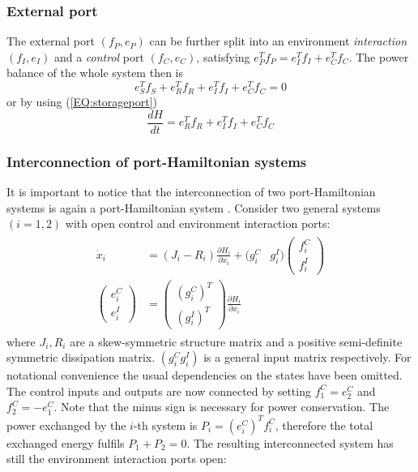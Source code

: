 \documentclass[a4paper,twoside, openright,12pt]{report}
\begin{document}
\subsubsection{External port}
The external port $(f_P,e_P)$ can be further split into an environment \emph{interaction} $(f_I,e_I)$ and a \emph{control} port $(f_C,e_C)$, satisfying $e_P^Tf_P = e_I^Tf_I + e_C^Tf_C$.
The power balance of the whole system then is
\begin{equation}
	e_S^Tf_S + e_R^T f_R +e_I^Tf_I + e_C^T f_C = 0
\end{equation} 
or by using (\ref{EQ:storageport})
\begin{equation}\label{EQ:energybalance}
	\frac{dH}{dt} = e_R^T f_R +e_I^Tf_I + e_C^T f_C 
\end{equation}

\subsubsection{Interconnection of port-Hamiltonian systems}
It is important to notice that the interconnection of two port-Hamiltonian systems is again a port-Hamiltonian system \cite{Schaft_14}. Consider two general systems $(i=1,2)$ with open control and environment interaction ports:
\begin{eqnarray}
\begin{aligned}
	\dot{x}_i &= (J_i - R_i)\frac{\partial H_i}{\partial x_i}+ (g_i^C & g_i^I)\begin{pmatrix}f_i^C \\ f_i^I\end{pmatrix}\\
	\begin{pmatrix}e_i^C \\ e_i^I\end{pmatrix} &= \begin{pmatrix}(g_i^C)^T \\ (g_i^I)^T\end{pmatrix}\frac{\partial H_i}{\partial x_i}
\end{aligned}
\end{eqnarray}
where $J_i,R_i$ are a skew-symmetric structure matrix and a positive semi-definite symmetric dissipation matrix. $(g_i^C g_i^I)$ is a general input matrix respectively.
For notational convenience the usual dependencies on the states have been omitted. The control inputs and outputs are now connected by setting $f_1^C = e_2^C $ and $ f_2^C = -e_1^C $. Note that the minus sign is necessary for power conservation. The power exchanged by the $i$-th system is $P_i = (e_i^C)^Tf_i^C$, therefore the total exchanged energy fulfils $ P_1 + P_2 = 0 $. The resulting interconnected system has still the environment interaction ports open:
\end{document}
